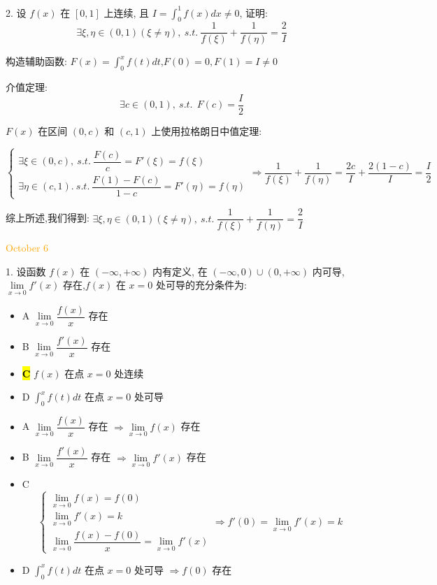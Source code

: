 2. 设 $f(x)$ 在 $[0,1]$ 上连续, 且 $\displaystyle{I=\int_{0}^{1}f(x)dx\neq 0}$, 证明:
$$\exists \xi,\eta\in(0,1)(\xi\neq \eta),\ s.t.\ \dfrac{1}{f(\xi)}+\dfrac{1}{f(\eta)}=\dfrac{2}{I}$$

\begin{solution}

	构造辅助函数: $\displaystyle{F(x)=\int_{0}^{x}f(t)dt}$,$F(0)=0,F(1)=I\neq 0$
	
	介值定理:  
	$$\exists c\in(0,1),\ s.t.\ \ F(c)=\dfrac{I}{2}$$
	
	$F(x)$ 在区间 $(0,c)$ 和 $(c,1)$ 上使用拉格朗日中值定理:  
	
	$$\begin{cases}
		\exists \xi  \in (0,c),\ s.t.\  \dfrac{F(c)}{c} = F'(\xi) = f(\xi) \\
		\exists \eta \in (c,1).\ s.t.\  \dfrac{F(1)-F(c)}{1-c} = F'(\eta) = f(\eta)
	\end{cases} \Rightarrow 
	\dfrac{1}{f(\xi)} + \dfrac{1}{f(\eta)} = \dfrac{2c}{I} + \dfrac{2(1-c)}{I} = \dfrac{I}{2}$$
	
	综上所述,我们得到: $\exists \xi,\eta\in(0,1)(\xi\neq \eta),\ s.t.\ \dfrac{1}{f(\xi)}+\dfrac{1}{f(\eta)}=\dfrac{2}{I}$
\end{solution}


\textcolor{orange}{October 6}

1. 设函数 $f(x)$ 在 $(-\infty,+\infty)$ 内有定义, 在 $(-\infty,0)\cup(0,+\infty)$ 内可导,
$\lim\limits_{x\to 0}f'(x)$ 存在,$f(x)$ 在 $x=0$ 处可导的充分条件为:  
\begin{itemize}
	\item A $\lim\limits_{x\to 0}\dfrac{f(x)}{x}$ 存在
	\item B $\lim\limits_{x\to 0}\dfrac{f'(x)}{x}$ 存在
	\item \hl{\textbf{C}} $f(x)$ 在点 $x=0$ 处连续
	\item D $\int_{0}^{x}f(t)dt$ 在点 $x=0$ 处可导
\end{itemize}

\begin{solution}
	\begin{itemize}
		\item A $\lim\limits_{x\to 0}\dfrac{f(x)}{x}$ 存在 $\Rightarrow \lim\limits_{x\to 0}f(x)$ 存在
		\item B $\lim\limits_{x\to 0}\dfrac{f'(x)}{x}$ 存在 $\Rightarrow \lim\limits_{x\to 0}f'(x)$ 存在
		\item C 
		$$
		\begin{cases}
			\lim\limits_{x\to 0}f(x) = f(0) \\
			\lim\limits_{x\to 0}f'(x) = k\\
		    \lim\limits_{x\to 0}\dfrac{f(x)-f(0)}{x} = \lim\limits_{x\to 0}f'(x)
		\end{cases}
		\Rightarrow f'(0) = \lim\limits_{x\to 0}f'(x) = k
		$$
		\item D $\int_{0}^{x}f(t)dt$ 在点 $x=0$ 处可导 $\Rightarrow f(0)$ 存在
	\end{itemize}
\end{solution}


